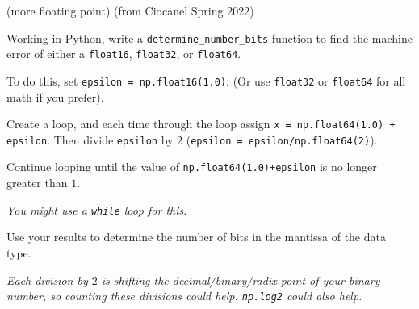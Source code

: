 \documentclass[12pt,letterpaper,noanswers]{exam}
\begin{document}
\begin{questions}













\question (more floating point) (from Ciocanel Spring 2022)
\begin{parts}
\item 
 Working in Python, write a \texttt{determine\_number\_bits} function to find the machine error of either a \texttt{float16}, \texttt{float32}, or \texttt{float64}.

To do this, set \texttt{epsilon = np.float16(1.0)}.  (Or use \texttt{float32} or \texttt{float64} for all math if you prefer).

Create a loop, and each time through the loop assign \texttt{x = np.float64(1.0) + epsilon}.  Then divide \texttt{epsilon} by $2$ (\texttt{epsilon = epsilon/np.float64(2)}).

Continue looping until the value of  \texttt{np.float64(1.0)+epsilon} is no longer greater than $1$.

\emph{You might use a \texttt{while} loop for this}.

Use your results to determine the number of bits in the mantissa of the data type.

\emph{Each division by $2$ is shifting the decimal/binary/radix point of your binary number, so counting these divisions could help.  \texttt{np.log2} could also help.}


\end{parts}
\end{questions}
\end{document}
